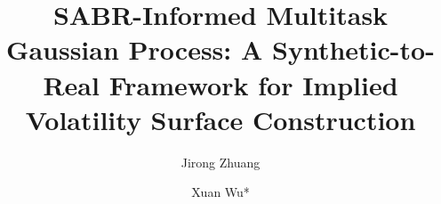 \documentclass[preprint,12pt]{elsarticle}
\begin{document}
\begin{frontmatter}



\title{SABR-Informed Multitask Gaussian Process: A Synthetic-to-Real Framework for Implied Volatility Surface Construction}


\author[inst1]{Jirong Zhuang}


\author[inst1]{Xuan Wu*}


\end{frontmatter}
\end{document}
